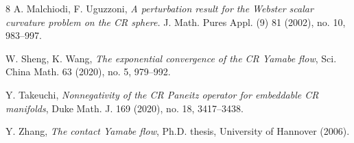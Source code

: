 \documentclass[a4paper,12pt]{amsart}
\begin{document}
\begin{thebibliography}{8}
  A. Malchiodi, F. Uguzzoni,
 \textit{A perturbation result for the Webster scalar curvature problem on the CR sphere.}
 J. Math. Pures Appl. (9) 81 (2002), no. 10, 983–997.

 W. Sheng, K. Wang, 
 \textit{The exponential convergence of the CR Yamabe flow}, Sci. China Math. 63 (2020), no. 5, 979–992. 

  Y. Takeuchi,
 \textit{Nonnegativity of the CR Paneitz operator for embeddable CR manifolds},
 Duke Math. J. 169 (2020), no. 18, 3417–3438.

 Y. Zhang, \textit{The contact Yamabe ﬂow},
Ph.D. thesis, University of Hannover (2006).
\end{thebibliography}
\end{document}
